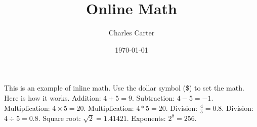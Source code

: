 \documentclass{article}
\title{Online Math}
\author{Charles Carter}
\date{\today{}}
\begin{document}
 
    \maketitle{}
	This is an example of inline math. Use the dollar symbol (\$) to set the math. Here is how it works. 
Addition: $4 \plus 5 = 9$. 
Subtraction: $4 - 5 = -1$. 
Multiplication: $4 \times 5 = 20$. 
Multiplication: $4 \ast 5 = 20$.
Division: $\frac{4}{5} = 0.8$. 
Division: $4 \div 5 = 0.8$. 
Square root: $\sqrt{2} = 1.41421$. 
Exponents: $2^8 = 256$.
	
\end{document}
